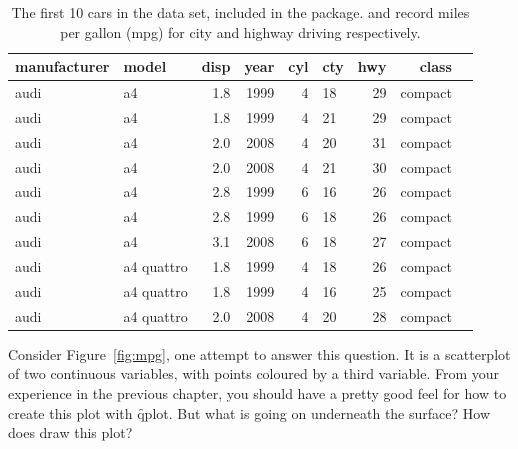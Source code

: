 \begin{table}
  \begin{center}
  \begin{tabular}{llrrrlrrl}
    \toprule
    manufacturer & model & disp & year & cyl & cty & hwy & class \\
    \midrule
    audi & a4         & 1.8 & 1999 & 4 & 18 & 29 & compact\\
    audi & a4         & 1.8 & 1999 & 4 & 21 & 29 & compact\\
    audi & a4         & 2.0 & 2008 & 4 & 20 & 31 & compact\\
    audi & a4         & 2.0 & 2008 & 4 & 21 & 30 & compact\\
    audi & a4         & 2.8 & 1999 & 6 & 16 & 26 & compact\\
    audi & a4         & 2.8 & 1999 & 6 & 18 & 26 & compact\\
    audi & a4         & 3.1 & 2008 & 6 & 18 & 27 & compact\\
    audi & a4 quattro & 1.8 & 1999 & 4 & 18 & 26 & compact\\
    audi & a4 quattro & 1.8 & 1999 & 4 & 16 & 25 & compact\\
    audi & a4 quattro & 2.0 & 2008 & 4 & 20 & 28 & compact\\
        \bottomrule
  \end{tabular}
  \end{center}
  \caption{The first 10 cars in the  data set, included in the \ggplot package.   and  record miles per gallon (mpg) for city and highway driving respectively.  }
  \label{tbl:mpg}
\end{table}

% 


Consider Figure~\ref{fig:mpg}, one attempt to answer this question.  It is a scatterplot of two continuous variables, with points coloured by a third variable.  From your experience in the previous chapter, you should have a pretty good feel for how to create this plot with \f{qplot}.  But what is going on underneath the surface?  How does \ggplot draw this plot?

